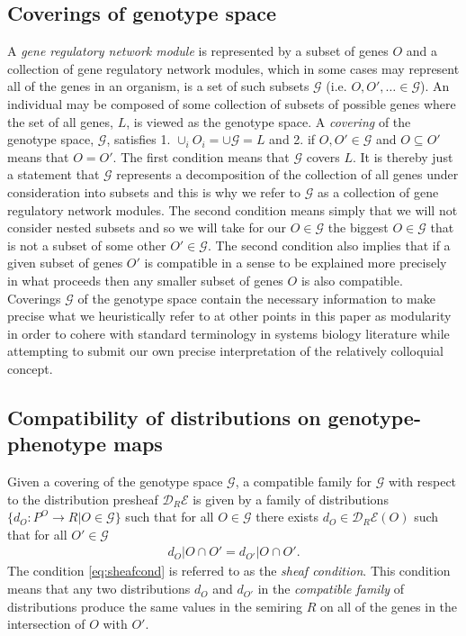 \subsection{Coverings of genotype space}
A \emph{gene regulatory network module} is represented by a subset of genes $O$ and a collection of gene regulatory network modules, which in some cases may represent all of the genes in an organism, is a set of such subsets $\mathcal{G}$ (i.e. $O,O',\ldots \in \mathcal{G}$). An individual may be composed of some collection of subsets of possible genes where the set of all genes, $L$, is viewed as the genotype space. A \emph{covering} of the genotype space, $\mathcal{G}$, satisfies 1. $\cup_i O_i = \cup \mathcal{G} = L$ and 2. if $O,O' \in \mathcal{G}$ and $O \subseteq O'$ means that $O = O'$. The first condition means that $\mathcal{G}$ covers $L$. It is thereby just a statement that $\mathcal{G}$ represents a decomposition of the collection of all genes under consideration into subsets and this is why we refer to $\mathcal{G}$ as a collection of gene regulatory network modules. The second condition means simply that we will not consider nested subsets and so we will take for our $O \in \mathcal{G}$ the biggest $O \in \mathcal{G}$ that is not a subset of some other $O' \in \mathcal{G}$. The second condition also implies that if a given subset of genes $O'$ is compatible in a sense to be explained more precisely in what proceeds then any smaller subset of genes $O$ is also compatible. Coverings $\mathcal{G}$ of the genotype space contain the necessary information to make precise what we heuristically refer to at other points in this paper as modularity in order to cohere with standard terminology in systems biology literature while attempting to submit our own precise interpretation of the relatively colloquial concept.

\subsection{Compatibility of distributions on genotype-phenotype maps}
Given a covering of the genotype space $\mathcal{G}$, a compatible family for $\mathcal{G}$ with respect to the distribution presheaf $\mathcal{D}_R\mathcal{E}$ is given by a family of distributions $\{d_O \colon P^O \rightarrow R | O \in \mathcal{G}\}$ such that for all $O \in \mathcal{G}$ there exists $d_O \in \mathcal{D}_R\mathcal{E}(O)$ such that for all $O' \in \mathcal{G}$
\begin{eqnarray}\label{eq:sheafcond}
d_O|O \cap O' = d_{O'}|O \cap O'.
\end{eqnarray}
The condition \ref{eq:sheafcond} is referred to as the \emph{sheaf condition}. This condition means that any two distributions $d_O$ and $d_{O'}$ in the \emph{compatible family} of distributions produce the same values in the semiring $R$ on all of the genes in the intersection of $O$ with $O'$.

